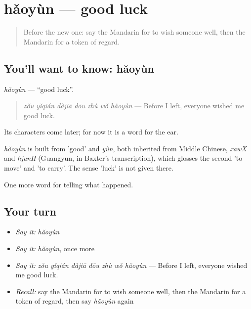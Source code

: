 \section[hǎoyùn]{hǎoyùn — good luck}

\label{lesson:ZH-C337-haoyun}



\begin{quote}
Before the new one: say the Mandarin for to wish someone well, then the Mandarin for a token of regard.
\end{quote}

\subsection*{You'll want to know: hǎoyùn}
\emph{hǎoyùn} — \textquotedblleft{}good luck\textquotedblright{}.

\begin{quote}
\emph{zǒu yǐqián dàjiā dōu zhù wǒ hǎoyùn} — Before I left, everyone wished me good luck.
\end{quote}

Its characters come later; for now it is a word for the ear.

\begin{cousinweb}
\emph{hǎoyùn} is built from  'good' and \emph{yùn}, both inherited from Middle Chinese, \emph{xawX} and \emph{hjunH} (Guangyun, in Baxter's transcription), which glosses the second 'to move' and 'to carry'. The sense 'luck' is not given there.
\end{cousinweb}

\begin{grammarlens}[title={What you've built}]
One more word for telling what happened.
\end{grammarlens}

\subsection*{Your turn}
\begin{itemize}
\raggedright
  \item \emph{Say it:} \emph{hǎoyùn}
  \item \emph{Say it:} \emph{hǎoyùn}, once more
  \item \emph{Say it:} \emph{zǒu yǐqián dàjiā dōu zhù wǒ hǎoyùn} — Before I left, everyone wished me good luck.
  \item \emph{Recall:} say the Mandarin for to wish someone well, then the Mandarin for a token of regard, then say \emph{hǎoyùn} again
\end{itemize}

